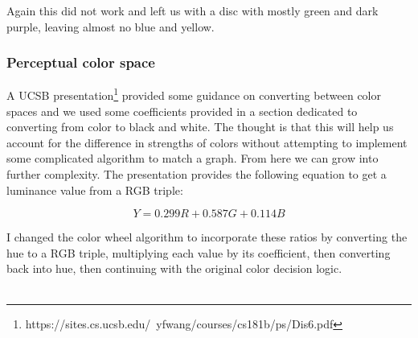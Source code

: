 \documentclass{article}
\begin{document}
\begin{multicols}{2}
\noindent
Again this did not work and left us with a disc with mostly green and dark purple, leaving almost no blue and yellow. 

\subsubsection{Perceptual color space}

A UCSB presentation\footnote{https://sites.cs.ucsb.edu/~yfwang/courses/cs181b/ps/Dis6.pdf} provided some guidance on converting between color spaces and we used some coefficients provided in a section dedicated to converting from color to black and white. The thought is that this will help us account for the difference in strengths of colors without attempting to implement some complicated algorithm to match a graph. From here we can grow into further complexity. The presentation provides the following equation to get a luminance value from a RGB triple:

\begin{equation}\label{perceptual equation}
Y = 0.299R + 0.587G + 0.114B	
\end{equation}

\noindent
I changed the color wheel algorithm to incorporate these ratios by converting the hue to a RGB triple, multiplying each value by its coefficient, then converting back into hue, then continuing with the original color decision logic.
\\
\

\noindent
{}
\end{multicols}
\end{document}
